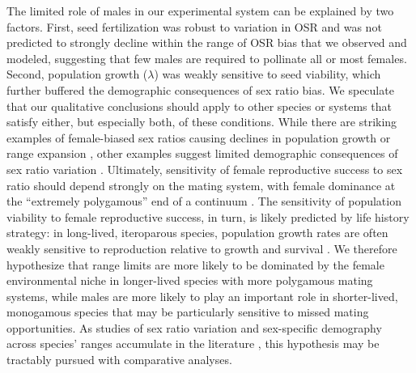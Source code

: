\documentclass[11pt]{article}\usepackage[]{graphicx}\usepackage[]{color}
\begin{document}
The limited role of males in our experimental system can be explained by two factors. 
First, seed fertilization was robust to variation in OSR and was not predicted to strongly decline within the range of OSR bias that we observed and modeled, suggesting that few males are required to pollinate all or most females. 
Second, population growth ($\lambda$) was weakly sensitive to seed viability, which further buffered the demographic consequences of sex ratio bias. 
We speculate that our qualitative conclusions should apply to other species or systems that satisfy either, but especially both, of these conditions. 
While there are striking examples of female-biased sex ratios causing declines in population growth \citep{milner2003reproductive} or range expansion \citep{miller2013sex}, other examples suggest limited demographic consequences of sex ratio variation \citep{mysterud2002role,ewen2011demographic,gownaris2020sex}. 
Ultimately, sensitivity of female reproductive success to sex ratio should depend strongly on the mating system, with female dominance at the ``extremely polygamous'' end of a continuum \citep{miller2011sex}. 
The sensitivity of population viability to female reproductive success, in turn, is likely predicted by life history strategy: in long-lived, iteroparous species, population growth rates are often weakly sensitive to reproduction relative to growth and survival \citep{franco2004comparative}. 
We therefore hypothesize that range limits are more likely to be dominated by the female environmental niche in longer-lived species with more polygamous mating systems, while males are more likely to play an important role in shorter-lived, monogamous species that may be particularly sensitive to missed mating opportunities. 
As studies of sex ratio variation and sex-specific demography across species' ranges accumulate in the literature \citep[e.g.,][]{dudaniec2021latitudinal,petry2016sex,lynch2014climate}, this hypothesis may be tractably pursued with comparative analyses. 
\end{document}
